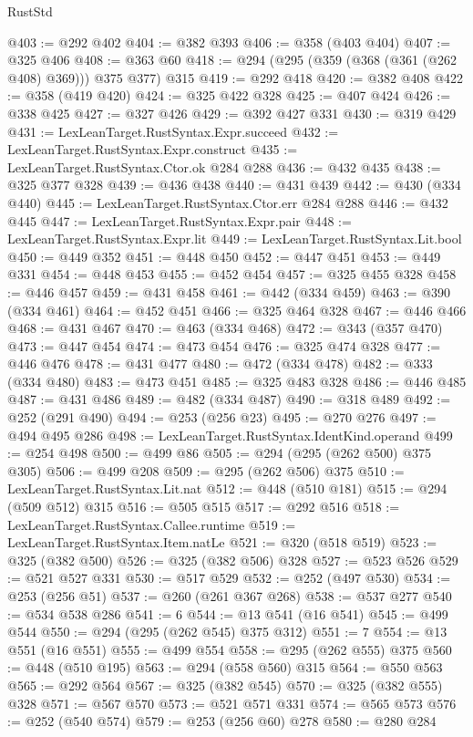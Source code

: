 \begin{lexlean}{RustStd}
\begin{coremodule}
{\begin{coremodule}
{{{{{{{{{{@403 := @292 @402
@404 := @382 @393
@406 := @358 (@403 @404)
@407 := @325 @406
@408 := @363 @60
@418 := @294 (@295 (@359 (@368 (@361 (@262 @408) @369))) @375 @377) @315
@419 := @292 @418
@420 := @382 @408
@422 := @358 (@419 @420)
@424 := @325 @422 @328
@425 := @407 @424
@426 := @338 @425
@427 := @327 @426
@429 := @392 @427 @331
@430 := @319 @429
@431 := LexLeanTarget.RustSyntax.Expr.succeed
@432 := LexLeanTarget.RustSyntax.Expr.construct
@435 := LexLeanTarget.RustSyntax.Ctor.ok @284 @288
@436 := @432 @435
@438 := @325 @377 @328
@439 := @436 @438
@440 := @431 @439
@442 := @430 (@334 @440)
@445 := LexLeanTarget.RustSyntax.Ctor.err @284 @288
@446 := @432 @445
@447 := LexLeanTarget.RustSyntax.Expr.pair
@448 := LexLeanTarget.RustSyntax.Expr.lit
@449 := LexLeanTarget.RustSyntax.Lit.bool
@450 := @449 @352
@451 := @448 @450
@452 := @447 @451
@453 := @449 @331
@454 := @448 @453
@455 := @452 @454
@457 := @325 @455 @328
@458 := @446 @457
@459 := @431 @458
@461 := @442 (@334 @459)
@463 := @390 (@334 @461)
@464 := @452 @451
@466 := @325 @464 @328
@467 := @446 @466
@468 := @431 @467
@470 := @463 (@334 @468)
@472 := @343 (@357 @470)
@473 := @447 @454
@474 := @473 @454
@476 := @325 @474 @328
@477 := @446 @476
@478 := @431 @477
@480 := @472 (@334 @478)
@482 := @333 (@334 @480)
@483 := @473 @451
@485 := @325 @483 @328
@486 := @446 @485
@487 := @431 @486
@489 := @482 (@334 @487)
@490 := @318 @489
@492 := @252 (@291 @490)
@494 := @253 (@256 @23)
@495 := @270 @276
@497 := @494 @495 @286
@498 := LexLeanTarget.RustSyntax.IdentKind.operand
@499 := @254 @498
@500 := @499 @86
@505 := @294 (@295 (@262 @500) @375 @305)
@506 := @499 @208
@509 := @295 (@262 @506) @375
@510 := LexLeanTarget.RustSyntax.Lit.nat
@512 := @448 (@510 @181)
@515 := @294 (@509 @512) @315
@516 := @505 @515
@517 := @292 @516
@518 := LexLeanTarget.RustSyntax.Callee.runtime
@519 := LexLeanTarget.RustSyntax.Item.natLe
@521 := @320 (@518 @519)
@523 := @325 (@382 @500)
@526 := @325 (@382 @506) @328
@527 := @523 @526
@529 := @521 @527 @331
@530 := @517 @529
@532 := @252 (@497 @530)
@534 := @253 (@256 @51)
@537 := @260 (@261 @367 @268)
@538 := @537 @277
@540 := @534 @538 @286
@541 := 6
@544 := @13 @541 (@16 @541)
@545 := @499 @544
@550 := @294 (@295 (@262 @545) @375 @312)
@551 := 7
@554 := @13 @551 (@16 @551)
@555 := @499 @554
@558 := @295 (@262 @555) @375
@560 := @448 (@510 @195)
@563 := @294 (@558 @560) @315
@564 := @550 @563
@565 := @292 @564
@567 := @325 (@382 @545)
@570 := @325 (@382 @555) @328
@571 := @567 @570
@573 := @521 @571 @331
@574 := @565 @573
@576 := @252 (@540 @574)
@579 := @253 (@256 @60) @278
@580 := @280 @284
}}}}}}}}}}
\end{coremodule}}
\end{coremodule}
\end{lexlean}
